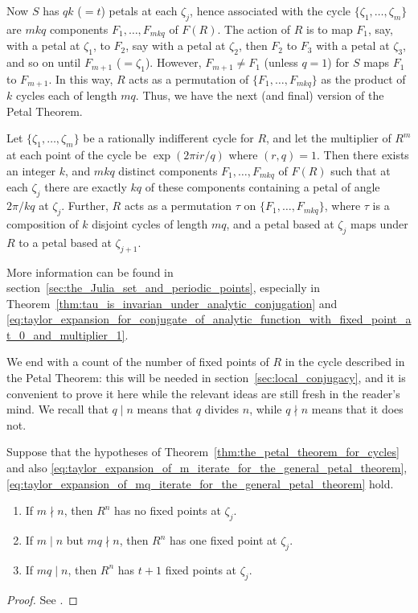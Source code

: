 Now $S$ has $qk$ ($=t$) petals at each $\zeta_j$, hence associated with the
cycle $\{\zeta_1, \dots, \zeta_m\}$ are $mkq$ components $F_1, \dots, F_{mkq}$
of $F(R)$. The action of $R$ is to map $F_1$, say, with a petal at $\zeta_1$, to
$F_2$, say with a petal at $\zeta_2$, then $F_2$ to $F_3$ with a petal at
$\zeta_3$, and so on until $F_{m+1}$ ($=\zeta_1$). However, $F_{m+1} \neq F_1$
(unless $q = 1$) for $S$ maps $F_1$ to $F_{m+1}$. In this way, $R$ acts as a
permutation of $\{F_1, \dots, F_{mkq}\}$ as the product of $k$ cycles each of
length $mq$. Thus, we have the next (and final) version of the Petal Theorem.

\begin{theorem}
    \label{thm:the_petal_theorem_for_cycles}
    Let $\{\zeta_1, \dots, \zeta_m\}$ be a rationally indifferent cycle for $R$,
    and let the multiplier of $R^m$ at each point of the cycle be $\exp(2\pi i
    r/q)$ where $(r, q) = 1$. Then there exists an integer $k$, and $mkq$
    distinct components $F_1, \dots, F_{mkq}$ of $F(R)$ such that at each
    $\zeta_j$ there are exactly $kq$ of these components containing a petal of
    angle $2\pi/kq$ at $\zeta_j$. Further, $R$ acts as a permutation $\tau$ on
    $\{F_1, \dots, F_{mkq}\}$, where $\tau$ is a composition of $k$ disjoint
    cycles of length $mq$, and a petal based at $\zeta_j$ maps under $R$ to a
    petal based at $\zeta_{j+1}$.
\end{theorem}

More information can be found in
section~\ref{sec:the_Julia_set_and_periodic_points}, especially in
Theorem~\ref{thm:tau_is_invarian_under_analytic_conjugation} and \eqref{eq:taylor_expansion_for_conjugate_of_analytic_function_with_fixed_point_at_0_and_multiplier_1}.

We end with a count of the number of fixed points of $R$ in the cycle described
in the Petal Theorem: this will be needed in section~\ref{sec:local_conjugacy},
and it is convenient to prove it here while the relevant ideas are still fresh
in the reader's mind. We recall that $q \mid n$ means that $q$ divides $n$,
while $q \nmid n$ means that it does not.

\begin{theorem}
    \label{thm:fixed_points_of_Rn_at_zeta_j}
    Suppose that the hypotheses of
    Theorem~\ref{thm:the_petal_theorem_for_cycles} and also
    \eqref{eq:taylor_expansion_of_m_iterate_for_the_general_petal_theorem},
    \eqref{eq:taylor_expansion_of_mq_iterate_for_the_general_petal_theorem}
    hold. 
    \begin{enumerate}[label=(\roman*)]
        \item If $m \nmid n$, then $R^n$ has no fixed points at $\zeta_j$.
        \item If $m \mid n$ but $mq \nmid n$, then $R^n$ has one fixed point at
        $\zeta_j$.
        \item If $mq \mid n$, then $R^n$ has $t+1$ fixed points at $\zeta_j$.
    \end{enumerate}
\end{theorem}
\begin{proof}
    See \cite[132]{Beardon1991}.
\end{proof}

